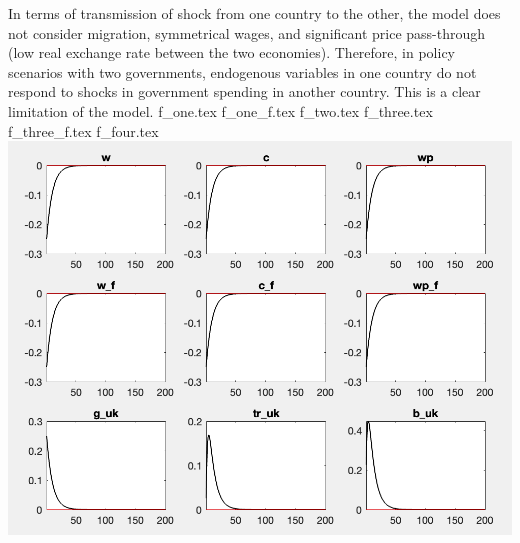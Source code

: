 In terms of transmission of shock from one country to the other, the model does not consider migration, symmetrical wages, and significant price pass-through (low real exchange rate between the two economies). Therefore, in policy scenarios with two governments, endogenous variables in one country do not respond to shocks in government spending in another country. This is a clear limitation of the model. 
{f_one.tex}
\newpage
{f_one_f.tex}
\newpage
\newpage
{f_two.tex}
\newpage
{f_three.tex}
\newpage
{f_three_f.tex}
\newpage
{f_four.tex}
\newpage
\includegraphics[width=\textwidth]{SCR-20230720-nhbg}